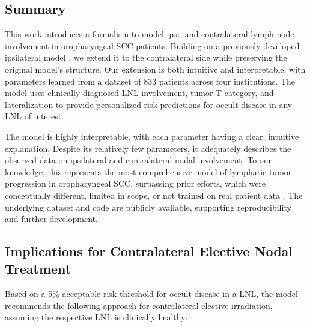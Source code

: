 \documentclass[
  sn-mathphys-num,
]{sn-jnl}
\begin{document}
\subsection{Summary}\label{summary}

This work introduces a formalism to model ipsi- and contralateral lymph
node involvement in oropharyngeal SCC patients. Building on a previously
developed ipsilateral model
\citep{ludwig_hidden_2021, ludwig_modelling_2023}, we extend it to the
contralateral side while preserving the original model's structure. Our
extension is both intuitive and interpretable, with parameters learned
from a dataset of 833 patients across four institutions. The model uses
clinically diagnosed LNL involvement, tumor T-category, and
lateralization to provide personalized risk predictions for occult
disease in any LNL of interest.

The model is highly interpretable, with each parameter having a clear,
intuitive explanation. Despite its relatively few parameters, it
adequately describes the observed data on ipsilateral and contralateral
nodal involvement. To our knowledge, this represents the most
comprehensive model of lymphatic tumor progression in oropharyngeal SCC,
surpassing prior efforts, which were conceptually different, limited in
scope, or not trained on real patient data
\citep{benson_markov_2006, jung_development_2017}. The underlying
dataset and code are publicly available, supporting reproducibility and
further development.

\subsection{Implications for Contralateral Elective Nodal
Treatment}\label{implications-for-contralateral-elective-nodal-treatment}

Based on a 5\% acceptable risk threshold for occult disease in a LNL,
the model recommends the following approach for contralateral elective
irradiation, assuming the respective LNL is clinically healthy:
\end{document}
